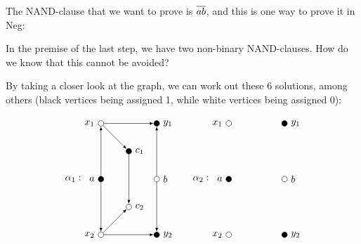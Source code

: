 The NAND-clause that we want to prove is $\ol{ab}$, and this is one way to prove it in Neg:
\begin{prooftree*}
\end{prooftree*}
In the premise of the last step, we have two non-binary NAND-clauses.
How do we know that this cannot be avoided?

By taking a closer look at the graph, we can work out these 6 solutions, among others (black vertices being assigned 1, while white vertices being assigned 0):

\[
  \begin{tikzpicture}
    [
    point/.style={circle,draw,inner sep=0pt,minimum size=2mm},
    one/.style={fill=black},
    collection/.style={thick,rectangle,draw,inner sep=0pt,minimum height=14mm, minimum width= 9mm}
    ]
    \node (label) at (-1,2) {$\alpha_1:$};
    \node (a) at (0,2) [point, one,label=left:$a$] {};
    \node (x1) at (0,4) [point,label=left:$x_1$] {};
    \node (x2) at (0,0) [point,label=left:$x_2$] {};
    \node (b) at (2,2) [point,label=right:$b$] {};
    \node (y1) at (2,4) [point, one,label=right:$y_1$] {};
    \node (y2) at (2,0) [point, one,label=right:$y_2$] {};
    \node (c1) at (1,3) [point, one,label=right:$c_1$] {};
    \node (c2) at (1,1) [point,label=right:$c_2$] {};
    \draw [-latex] (a) to (x1);
    \draw [-latex] (a) to (x2);
    \draw [-latex] (b) to (y1);
    \draw [-latex] (b) to (y2);
    \draw [-latex] (x1) to (y1);
    \draw [-latex] (x1) to (c1);
    \draw [-latex] (x2) to (y2);
    \draw [-latex] (x2) to (c2);
    \draw [-latex] (c1) to (c2);
  \end{tikzpicture}
  \hspace{5mm}
  \begin{tikzpicture}
    [
    point/.style={circle,draw,inner sep=0pt,minimum size=2mm},
    one/.style={fill=black},
    collection/.style={thick,rectangle,draw,inner sep=0pt,minimum height=14mm, minimum width= 9mm}
    ]
    \node (label) at (-1,2) {$\alpha_2:$};
    \node (a) at (0,2) [point, one,label=left:$a$] {};
    \node (x1) at (0,4) [point,label=left:$x_1$] {};
    \node (x2) at (0,0) [point,label=left:$x_2$] {};
    \node (b) at (2,2) [point,label=right:$b$] {};
    \node (y1) at (2,4) [point, one,label=right:$y_1$] {};
    \node (y2) at (2,0) [point, one, label=right:$y_2$] {};

\end{tikzpicture}\]
